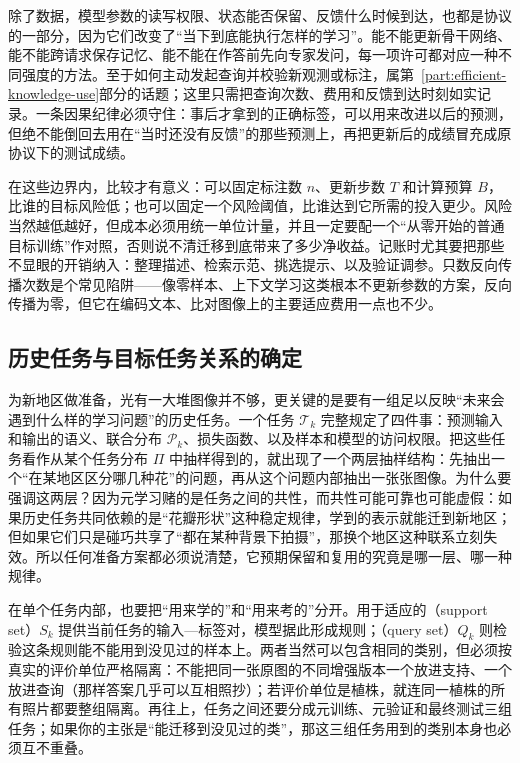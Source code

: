 除了数据，模型参数的读写权限、状态能否保留、反馈什么时候到达，也都是协议的一部分，因为它们改变了“当下到底能执行怎样的学习”。能不能更新骨干网络、能不能跨请求保存记忆、能不能在作答前先向专家发问，每一项许可都对应一种不同强度的方法。至于如何主动发起查询并校验新观测或标注，属第~\ref{part:efficient-knowledge-use}部分的话题；这里只需把查询次数、费用和反馈到达时刻如实记录。一条因果纪律必须守住：事后才拿到的正确标签，可以用来改进以后的预测，但绝不能倒回去用在“当时还没有反馈”的那些预测上，再把更新后的成绩冒充成原协议下的测试成绩。

在这些边界内，比较才有意义：可以固定标注数 $n$、更新步数 $T$ 和计算预算 $B$，比谁的目标风险低；也可以固定一个风险阈值，比谁达到它所需的投入更少。风险当然越低越好，但成本必须用统一单位计量，并且一定要配一个“从零开始的普通目标训练”作对照，否则说不清迁移到底带来了多少净收益。记账时尤其要把那些不显眼的开销纳入：整理描述、检索示范、挑选提示、以及验证调参。只数反向传播次数是个常见陷阱——像零样本、上下文学习这类根本不更新参数的方案，反向传播为零，但它在编码文本、比对图像上的主要适应费用一点也不少。

\subsection{历史任务与目标任务关系的确定}
\label{sec:ket-transfer-task-splits}

为新地区做准备，光有一大堆图像并不够，更关键的是要有一组足以反映“未来会遇到什么样的学习问题”的历史任务。一个任务 $\mathcal T_k$ 完整规定了四件事：预测输入和输出的语义、联合分布 $\mathcal P_k$、损失函数、以及样本和模型的访问权限。把这些任务看作从某个任务分布 $\Pi$ 中抽样得到的，就出现了一个两层抽样结构：先抽出一个“在某地区区分哪几种花”的问题，再从这个问题内部抽出一张张图像。为什么要强调这两层？因为元学习赌的是任务之间的共性，而共性可能可靠也可能虚假：如果历史任务共同依赖的是“花瓣形状”这种稳定规律，学到的表示就能迁到新地区；但如果它们只是碰巧共享了“都在某种背景下拍摄”，那换个地区这种联系立刻失效。所以任何准备方案都必须说清楚，它预期保留和复用的究竟是哪一层、哪一种规律。

在单个任务内部，也要把“用来学的”和“用来考的”分开。用于适应的（support set）$S_k$ 提供当前任务的输入—标签对，模型据此形成规则；（query set）$Q_k$ 则检验这条规则能不能用到没见过的样本上。两者当然可以包含相同的类别，但必须按真实的评价单位严格隔离：不能把同一张原图的不同增强版本一个放进支持、一个放进查询（那样答案几乎可以互相照抄）；若评价单位是植株，就连同一植株的所有照片都要整组隔离。再往上，任务之间还要分成元训练、元验证和最终测试三组任务；如果你的主张是“能迁移到没见过的类”，那这三组任务用到的类别本身也必须互不重叠。

